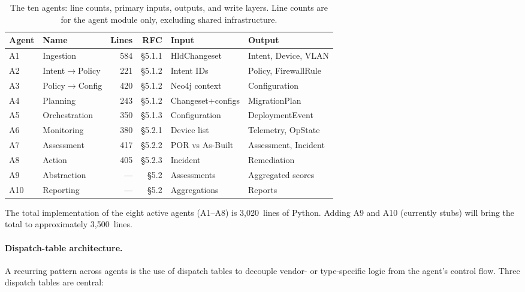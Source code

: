 \documentclass[acmtog]{acmart}
\renewcommand\_{\textunderscore\allowbreak}
\begin{document}
\begin{table}[t]
\footnotesize
\centering
\caption{The ten agents: line counts, primary inputs, outputs, and
write layers. Line counts are for the agent module only, excluding
shared infrastructure.}
\label{tab:agents}
\begin{tabular}{@{}llrrll@{}}
\toprule
\textbf{Agent} & \textbf{Name} & \textbf{Lines} & \textbf{RFC} & \textbf{Input} & \textbf{Output}\\
\midrule
A1 & Ingestion              & 584 & \S5.1.1 & HldChangeset      & Intent, Device, VLAN\\
A2 & Intent$\rightarrow$Policy        & 221 & \S5.1.2 & Intent IDs        & Policy, FirewallRule\\
A3 & Policy$\rightarrow$Config        & 420 & \S5.1.2 & Neo4j context     & Configuration\\
A4 & Planning               & 243 & \S5.1.2 & Changeset+configs & MigrationPlan\\
A5 & Orchestration          & 350 & \S5.1.3 & Configuration     & DeploymentEvent\\
A6 & Monitoring             & 380 & \S5.2.1 & Device list       & Telemetry, OpState\\
A7 & Assessment             & 417 & \S5.2.2 & POR vs As-Built   & Assessment, Incident\\
A8 & Action                 & 405 & \S5.2.3 & Incident          & Remediation\\
A9 & Abstraction            & --- & \S5.2   & Assessments       & Aggregated scores\\
A10& Reporting              & --- & \S5.2   & Aggregations      & Reports\\
\bottomrule
\end{tabular}
\end{table}

The total implementation of the eight active agents (A1--A8) is
3,020~lines of Python. Adding A9 and A10 (currently stubs) will
bring the total to approximately 3,500~lines.

\paragraph{Dispatch-table architecture.}
A recurring pattern across agents is the use of dispatch tables to
decouple vendor- or type-specific logic from the agent's control
flow. Three dispatch tables are central:
\end{document}
